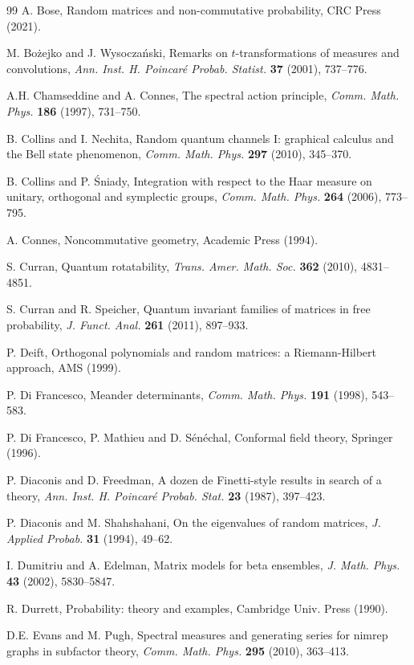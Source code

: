 \documentclass[12pt]{amsbook}
\begin{document}
\begin{thebibliography}{99}
A. Bose, Random matrices and non-commutative probability, CRC Press (2021).

M. Bo\.zejko and J. Wysocza\'nski, Remarks on $t$-transformations of measures and convolutions, {\em Ann. Inst. H. Poincar\'e Probab. Statist.} {\bf 37} (2001), 737--776.

A.H. Chamseddine and A. Connes, The spectral action principle, {\em Comm. Math. Phys.} {\bf 186} (1997), 731--750.

B. Collins and I. Nechita, Random quantum channels I: graphical calculus and the Bell state phenomenon, {\em Comm. Math. Phys.} {\bf 297} (2010), 345--370.

B. Collins and P. \'Sniady, Integration with respect to the Haar measure on unitary, orthogonal and symplectic groups, {\em Comm. Math. Phys.} {\bf 264} (2006), 773--795.

A. Connes, Noncommutative geometry, Academic Press (1994).

S. Curran, Quantum rotatability, {\em Trans. Amer. Math. Soc.} {\bf 362} (2010), 4831--4851.

S. Curran and R. Speicher, Quantum invariant families of matrices in free probability, {\em J. Funct. Anal.} {\bf 261} (2011), 897--933.

P. Deift, Orthogonal polynomials and random matrices: a Riemann-Hilbert approach, AMS (1999).

P. Di Francesco, Meander determinants, {\em Comm. Math. Phys.} {\bf 191} (1998), 543--583.

P. Di Francesco, P. Mathieu and D. S\'en\'echal, Conformal field theory, Springer (1996).

P. Diaconis and D. Freedman, A dozen de Finetti-style results in search
  of a theory, {\em Ann. Inst. H. Poincar\'e Probab. Stat.} {\bf 23} (1987), 397--423.

P. Diaconis and M. Shahshahani, On the eigenvalues of random matrices,
{\em J. Applied Probab.} {\bf 31} (1994), 49--62.

I. Dumitriu and A. Edelman, Matrix models for beta ensembles, {\em J. Math. Phys.} {\bf 43} (2002), 5830--5847.

R. Durrett, Probability: theory and examples, Cambridge Univ. Press (1990).

D.E. Evans and M. Pugh, Spectral measures and generating series for nimrep graphs in subfactor theory, {\em Comm. Math. Phys.} {\bf 295} (2010), 363--413.


\end{thebibliography}
\end{document}
